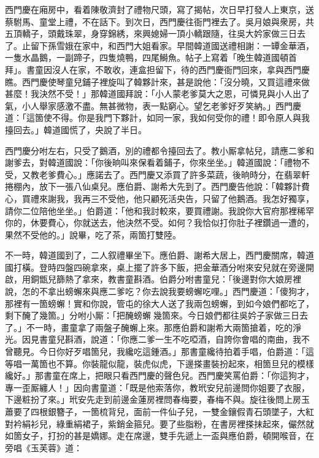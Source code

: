 西門慶在廂房中，看着陳敬濟封了禮物尺頭，寫了揭帖，次日早打發人上東京，送蔡駙馬、童堂上禮，不在話下。到次日，西門慶往衙門裡去了。吳月娘與衆房，共五頂轎子，頭戴珠翠，身穿錦綉，來興媳婦一頂小轎跟隨，往吳大妗家做三日去了。止留下孫雪娥在家中，和西門大姐看家。早間韓道國送禮相謝：一罈金華酒，一隻水晶鵝，一副蹄子，四隻燒鴨，四尾鰣魚。帖子上寫着「晚生韓道國頓首拜」。書童因沒人在家，不敢收，連盒担留下，待的西門慶衙門回來，拿與西門慶瞧。西門慶使琴童兒鋪子裡旋叫了韓夥計來，甚是說他：「沒分曉，又買這禮來做甚麼！我決然不受！」那韓道國拜說：「小人蒙老爹莫大之恩，可憐見與小人出了氣，小人舉家感激不盡。無甚微物，表一點窮心。望乞老爹好歹笑納。」西門慶道：「這箇使不得。你是我門下夥計，如同一家，我如何受你的禮！即令原人與我擡回去。」韓道國慌了，央說了半日。

西門慶分咐左右，只受了鵝酒，別的禮都令擡回去了。教小厮拿帖兒，請應二爹和謝爹去，對韓道國說：「你後晌叫來保看着鋪子，你來坐坐。」韓道國說：「禮物不受，又教老爹費心。」應諾去了。西門慶又添買了許多菜蔬，後晌時分，在翡翠軒捲棚內，放下一張八仙桌兒。應伯爵、謝希大先到了。西門慶告他說：「韓夥計費心，買禮來謝我，我再三不受他，他只顧死活央告，只留了他鵝酒。我怎好獨享，請你二位陪他坐坐。」伯爵道：「他和我討較來，要買禮謝。我說你大官府那裡稀罕你的，休要費心，你就送去，他決然不受。如何？我恰似打你肚子裡鑽過一遭的，果然不受他的。」說畢，吃了茶，兩箇打雙陸。

不一時，韓道國到了，二人叙禮畢坐下。應伯爵、謝希大居上，西門慶關席，韓道國打橫。登時四盤四碗拿來，桌上擺了許多下飯，把金華酒分咐來安兒就在旁邊開啟，用銅甑兒篩熱了拿來，教書童斟酒。伯爵分咐書童兒：「後邊對你大娘房裡說，怎的不拿出螃蠏來與應二爹吃？你去說我要螃蠏吃哩。」西門慶道：「傻狗才，那裡有一箇螃蠏！實和你說，管屯的徐大人送了我兩包螃蠏，到如今娘們都吃了，剩下醃了幾箇。」分咐小厮：「把醃螃蠏𢵞幾箇來。今日娘們都往吳妗子家做三日去了。」不一時，畫童拿了兩盤子醃蠏上來。那應伯爵和謝希大兩箇搶着，吃的淨光。因見書童兒斟酒，說道：「你應二爹一生不吃啞酒，自誇你會唱的南曲，我不曾聽見。今日你好歹唱箇兒，我纔吃這鍾酒。」那書童纔待拍着手唱，伯爵道：「這等唱一萬箇也不算。你裝龍似龍，裝虎似虎，下邊搽畫裝扮起來，相箇旦兒的模樣纔好。」{}那書童在席上，把眼只看西門慶的聲色兒。西門慶笑罵伯爵：「你這狗才，專一歪厮纏人！」因向書童道：「既是他索落你，教玳安兒前邊問你姐要了衣服，下邊粧扮了來。」玳安先走到前邊金蓮房裡問春梅要，春梅不與。旋往後問上房玉蕭要了四根銀簪子，一箇梳背兒，面前一件仙子兒，一雙金鑲假青石頭墜子，大紅對衿絹衫兒，綠重絹裙子，紫銷金箍兒。要了些脂粉，在書房裡搽抹起來，儼然就如箇女子，打扮的甚是嬌娜。走在席邊，雙手先遞上一盃與應伯爵，頓開喉音，在旁唱《玉芙蓉》道：

